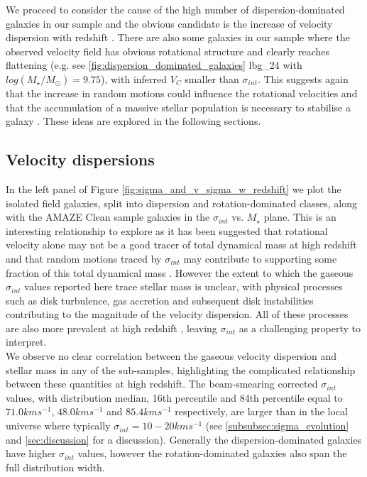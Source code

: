 \documentclass[fleqn,usenatbib]{mn2e}
\begin{document}
We proceed to consider the cause of the high number of dispersion-dominated galaxies in our sample and the obvious candidate is the increase of velocity dispersion with redshift \citep[e.g.][]{Genzel2006,Genzel2008,ForsterSchreiber2009,Law2009,Gnerucci2011,Epinat2012,Wisnioski2015}.
There are also some galaxies in our sample where the observed velocity field has obvious rotational structure and clearly reaches flattening (e.g. see \cref{fig:dispersion_dominated_galaxies} lbg\_24 with $log(M_{\star}/M_{\odot})=9.75$), with inferred $V_{C}$ smaller than $\sigma_{int}$.
This suggests again that the increase in random motions could influence the rotational velocities and that the accumulation of a massive stellar population is necessary to stabilise a galaxy \citep[e.g.][]{Law2009,Law2012b,Law2012c,Newman2013,Wisnioski2015}.
These ideas are explored in the following sections.

\subsection{Velocity dispersions}\label{subsec:results_velocity_dispersions}

In the left panel of Figure \ref{fig:sigma_and_v_sigma_w_redshift} we plot the isolated field galaxies, split into dispersion and rotation-dominated classes, along with the AMAZE Clean sample galaxies in the $\sigma_{int}$ vs. $M_{\star}$ plane.
This is an interesting relationship to explore as it has been suggested that rotational velocity alone may not be a good tracer of total dynamical mass at high redshift and that random motions traced by $\sigma_{int}$ may contribute to supporting some fraction of this total dynamical mass \citep[e.g.][]{Kassin2007,Burkert2010,Kassin2012,Law2012b,Law2012c,Ubler2017,Genzel2017}.
However the extent to which the gaseous $\sigma_{int}$ values reported here trace stellar mass is unclear, with physical processes such as disk turbulence, gas accretion and subsequent disk instabilities contributing to the magnitude of the velocity dispersion.
All of these processes are also more prevalent at high redshift \citep{Genzel2006,ForsterSchreiber2009,Law2009,Genzel2011,Wisnioski2015,Wuyts2016b}, leaving $\sigma_{int}$ as a challenging property to interpret. \\ 

We observe no clear correlation between the gaseous velocity dispersion and stellar mass in any of the sub-samples, highlighting the complicated relationship between these quantities at high redshift.
The beam-smearing corrected $\sigma_{int}$ values, with distribution median, 16th percentile and 84th percentile equal to $71.0kms^{-1}$, $48.0kms^{-1}$ and $85.4kms^{-1}$ respectively, are larger than in the local universe where typically $\sigma_{int} = 10-20kms^{-1}$ \citep{Epinat2008a} (see \cref{subsubsec:sigma_evolution} and \cref{sec:discussion} for a discussion).
Generally the dispersion-dominated galaxies have higher $\sigma_{int}$ values, however the rotation-dominated galaxies also span the full distribution width.
\end{document}
